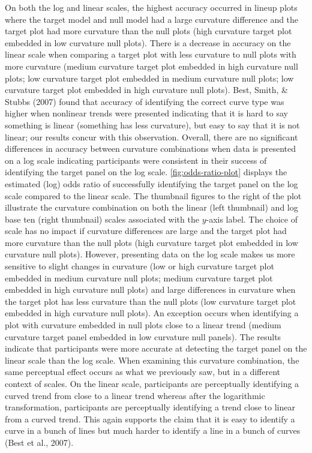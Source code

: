 \documentclass[print]{nuthesis}
\begin{document}
On both the log and linear scales, the highest accuracy occurred in lineup plots where the target model and null model had a large curvature difference and the target plot had more curvature than the null plots (high curvature target plot embedded in low curvature null plots).
There is a decrease in accuracy on the linear scale when comparing a target plot with less curvature to null plots with more curvature (medium curvature target plot embedded in high curvature null plots; low curvature target plot embedded in medium curvature null plots; low curvature target plot embedded in high curvature null plots).
Best, Smith, \& Stubbs (2007) found that accuracy of identifying the correct curve type was higher when nonlinear trends were presented indicating that it is hard to say something is linear (something has less curvature), but easy to say that it is not linear; our results concur with this observation.
Overall, there are no significant differences in accuracy between curvature combinations when data is presented on a log scale indicating participants were consistent in their success of identifying the target panel on the log scale. 
\cref{fig:odds-ratio-plot} displays the estimated (log) odds ratio of successfully identifying the target panel on the log scale compared to the linear scale. The thumbnail figures to the right of the plot illustrate the curvature combination on both the linear (left thumbnail) and log base ten (right thumbnail) scales associated with the \(y\)-axis label.
The choice of scale has no impact if curvature differences are large and the target plot had more curvature than the null plots (high curvature target plot embedded in low curvature null plots).
However, presenting data on the log scale makes us more sensitive to slight changes in curvature (low or high curvature target plot embedded in medium curvature null plots; medium curvature target plot embedded in high curvature null plots) and large differences in curvature when the target plot has less curvature than the null plots (low curvature target plot embedded in high curvature null plots).
An exception occurs when identifying a plot with curvature embedded in null plots close to a linear trend (medium curvature target panel embedded in low curvature null panels).
The results indicate that participants were more accurate at detecting the target panel on the linear scale than the log scale.
When examining this curvature combination, the same perceptual effect occurs as what we previously saw, but in a different context of scales.
On the linear scale, participants are perceptually identifying a curved trend from close to a linear trend whereas after the logarithmic transformation, participants are perceptually identifying a trend close to linear from a curved trend.
This again supports the claim that it is easy to identify a curve in a bunch of lines but much harder to identify a line in a bunch of curves (Best et al., 2007).
\end{document}
